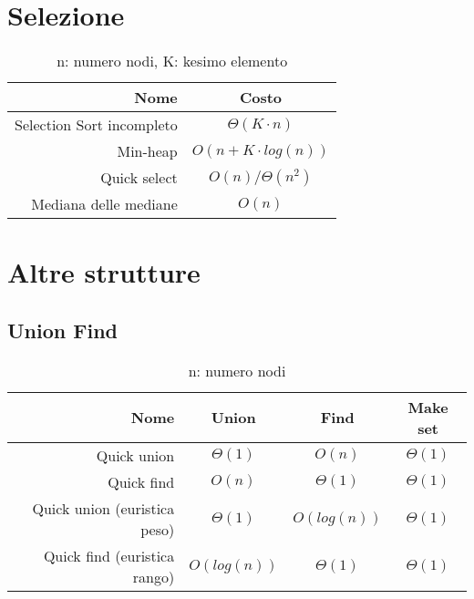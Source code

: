 \documentclass{article}
\begin{document}
\section{Selezione}
\begin{table}[H]
    \centering
    \def\arraystretch{1.5}
    \begin{tabular}{|r|c|} \hline
          \textbf{Nome} & \textbf{Costo} \\ \hline
          Selection Sort incompleto & $\Theta(K\cdot n)$ \\ \hline
          Min-heap & $O(n+K\cdot log(n))$ \\ \hline
          Quick select & $O(n)/\Theta(n^2)$ \\ \hline
          Mediana delle mediane & $O(n)$ \\ \hline
    \end{tabular}
    \caption{n: numero nodi, K: kesimo elemento}
    \label{tab:my_label}
\end{table}
\section{Altre strutture}
\subsection{Union  Find}
\begin{table}[H]
    \centering
    \def\arraystretch{1.5}
    \begin{tabular}{|r|c|c|c|} \hline
          \textbf{Nome} & \textbf{Union} & \textbf{Find} & \textbf{Make set} \\ \hline
          Quick union & $\Theta(1)$ & $O(n)$ & $\Theta(1)$ \\ \hline
          Quick find & $O(n)$& $\Theta(1)$ & $\Theta(1)$ \\ \hline
          Quick union (euristica peso) & $\Theta(1)$ & $O(log(n))$ & $\Theta(1)$ \\ \hline
          Quick find (euristica rango) & $O(log(n))$ & $\Theta(1)$ & $\Theta(1)$ \\ \hline
    \end{tabular}
    \caption{n: numero nodi}
    \label{tab:my_label}
\end{table}
\end{document}
